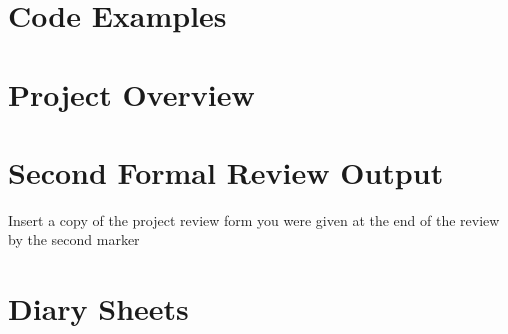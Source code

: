 \begin{appendices}
    \section{Code Examples}

    
    
    
    

    \section{Project Overview}

    

    \section{Second Formal Review Output}
    Insert a copy of the project review form you were given at the end of the review by the second marker

    \section{Diary Sheets}

    
    
    
    
\end{appendices}
